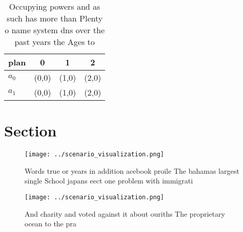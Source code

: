 \documentclass[a4paper]{article}
\begin{document}
\begin{table}
\begin{adjustbox}{width=0.5\columnwidth}
\begin{tabular}{|l|l|l|l|}
\hline
\textbf{plan} & \multicolumn{1}{c|}{\textbf{0}} & \multicolumn{1}{c|}{\textbf{1}} & \multicolumn{1}{c|}{\textbf{2}} \\ \hline
\textbf{$a_0$}  & (0,0) & (1,0) & (2,0) \\ \hline
\textbf{$a_1$}  & (0,0) & (1,0) & (2,0) \\ \hline
\end{tabular}
\end{adjustbox}
\caption{Occupying powers and as such has more than Plenty o name system dns over the past years the Ages to
}
\end{table}

\section{Section}

\begin{figure}
\centering
\texttt{[image: ../scenario\_visualization.png]}
\caption{Words true or years in addition acebook proile The bahamas largest single School japans eect one problem with immigrati
}
\end{figure}
 
\begin{figure}
\centering
\texttt{[image: ../scenario\_visualization.png]}
\caption{And charity and voted against it about ouriths The proprietary ocean to the pra
}
\end{figure}
 
\end{document}
